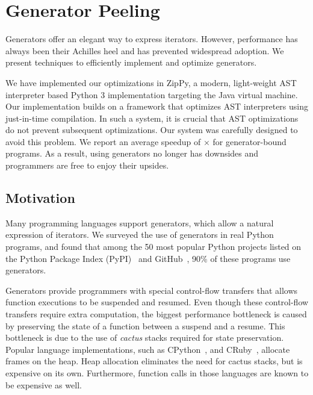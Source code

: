 \chapter{Generator Peeling}
\label{chp:ch4-peeling}

Generators offer an elegant way to express iterators.
However, performance has always been their Achilles heel and has prevented widespread adoption.
We present techniques to efficiently implement and optimize generators.

We have implemented our optimizations in ZipPy, a modern, light-weight AST interpreter based Python 3 implementation targeting the Java virtual machine.
Our implementation builds on a framework that optimizes AST interpreters using just-in-time compilation.
In such a system, it is crucial that AST optimizations do not prevent subsequent optimizations.
Our system was carefully designed to avoid this problem.
We report an average speedup of \peelingSpeedup{}$\times$ for generator-bound programs.
As a result, using generators no longer has downsides and programmers are free to enjoy their upsides.

\section{Motivation}

Many programming languages support generators, which allow a natural expression of iterators.
We surveyed the use of generators in real Python programs, and found that among the 50 most popular Python projects
listed on the Python Package Index (PyPI)~\cite{pypi} and GitHub~\cite{github}, 90\% of these programs use generators.

Generators provide programmers with special control-flow transfers that allows function executions to be suspended and resumed.
Even though these control-flow transfers require extra computation, the biggest performance bottleneck is caused by preserving the state of a function between a suspend and a resume.
This bottleneck is due to the use of \emph{cactus} stacks required for state preservation.
Popular language implementations, such as CPython~\cite{python}, and CRuby~\cite{ruby}, allocate frames on the heap.
Heap allocation eliminates the need for cactus stacks, but is expensive on its own.
Furthermore, function calls in those languages are known to be expensive as well.

